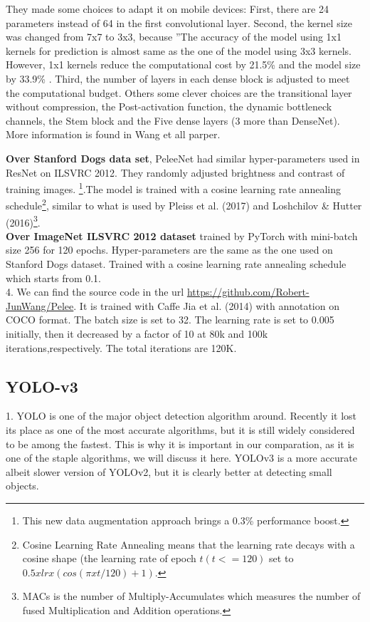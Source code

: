 \documentclass[10pt]{article}
\begin{document}
They made some choices to adapt it on mobile devices: First, there are 24 parameters instead of 64 in the ﬁrst convolutional layer. Second, the kernel size was changed from 7x7 to 3x3, because ”The accuracy of the model using 1x1 kernels for prediction is almost same as the one of the model using 3x3 kernels. However, 1x1 kernels reduce the computational cost by 21.5\% and the model size by 33.9\% \cite{wang2018pelee}. Third, the number of layers in each dense block is adjusted to meet the computational budget. Others some clever choices are the transitional layer without compression, the Post-activation function, the dynamic bottleneck channels, the Stem block and the Five dense layers (3 more than DenseNet). More information is found in Wang et all parper.\cite{wang2018pelee}

\textbf{Over Stanford Dogs data set}\cite{wang2018pelee}, PeleeNet had similar hyper-parameters used in ResNet on ILSVRC 2012. They randomly adjusted brightness and contrast of training images. \footnote{This new data augmentation approach brings a 0.3\% performance boost.}.The model is trained with a cosine learning rate annealing schedule\footnote{Cosine Learning Rate Annealing means that the learning rate decays with a cosine shape (the learning rate of epoch $t (t <= 120)$ set to $0.5 x lr x (cos(\pi x t/120) + 1)$.}, similar to what is used by Pleiss et al. (2017) and Loshchilov & Hutter (2016)\footnote{MACs is the number of Multiply-Accumulates which measures the number of fused Multiplication and Addition operations.}.\\
\textbf{Over ImageNet ILSVRC 2012 dataset} trained by PyTorch with mini-batch size 256 for 120 epochs. Hyper-parameters are the same as the one used on Stanford Dogs dataset. Trained with a cosine learning rate annealing schedule which starts from 0.1.\\

4. We can find the source code in the url \url{https://github.com/Robert-JunWang/Pelee}.
It is trained with Caffe Jia et al. (2014) with annotation on COCO format. The batch size is set to 32. The learning rate is set to 0.005 initially, then it decreased by a factor of 10 at 80k and 100k iterations,respectively. The total iterations are 120K.


\subsection{YOLO-v3}

1. YOLO is one of the major object detection algorithm around. Recently it lost its place as one of the most accurate algorithms, but it is still widely considered to be among the fastest. This is why it is important in our comparation, as it is one of the staple algorithms, we will discuss it here. YOLOv3\cite{redmon2018yolov3} is a more accurate albeit slower version of YOLOv2, but it is clearly better at detecting small objects.\\
\end{document}
